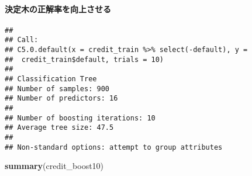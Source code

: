\documentclass[
]{article}
\newenvironment{Shaded}{\begin{snugshade}}{\end{snugshade}}
\newcommand{\AttributeTok}[1]{\textcolor[rgb]{0.13,0.29,0.53}{#1}}
\newcommand{\DecValTok}[1]{\textcolor[rgb]{0.00,0.00,0.81}{#1}}
\newcommand{\FunctionTok}[1]{\textcolor[rgb]{0.13,0.29,0.53}{\textbf{#1}}}
\newcommand{\NormalTok}[1]{#1}
\newcommand{\OtherTok}[1]{\textcolor[rgb]{0.56,0.35,0.01}{#1}}
\newcommand{\SpecialCharTok}[1]{\textcolor[rgb]{0.81,0.36,0.00}{\textbf{#1}}}
\begin{document}
\paragraph{決定木の正解率を向上させる}\label{ux6c7aux5b9aux6728ux306eux6b63ux89e3ux7387ux3092ux5411ux4e0aux3055ux305bux308b}

\begin{Shaded}
\end{Shaded}

\begin{verbatim}
## 
## Call:
## C5.0.default(x = credit_train %>% select(-default), y =
##  credit_train$default, trials = 10)
## 
## Classification Tree
## Number of samples: 900 
## Number of predictors: 16 
## 
## Number of boosting iterations: 10 
## Average tree size: 47.5 
## 
## Non-standard options: attempt to group attributes
\end{verbatim}

\begin{Shaded}
\begin{Highlighting}[]
\FunctionTok{summary}\NormalTok{(credit\_boost10)}
\end{Highlighting}
\end{Shaded}
\end{document}
